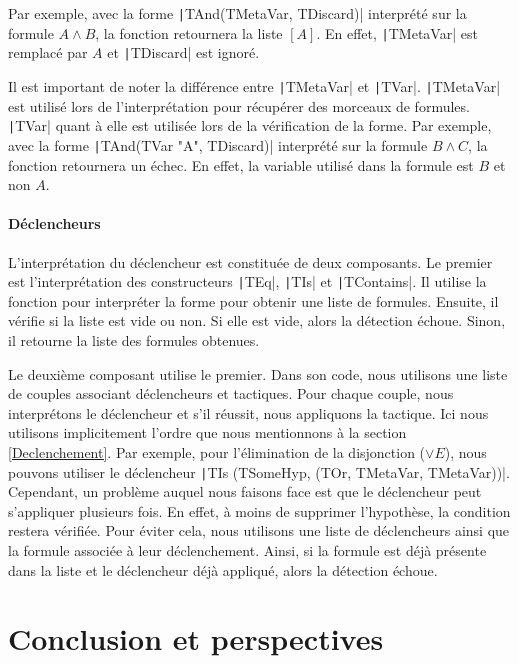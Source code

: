 \documentclass[titlepage]{article}
\begin{document}
Par exemple, avec la forme \texttt|TAnd(TMetaVar, TDiscard)| interprété sur la formule $A \land B$, la fonction retournera la liste $[A]$. En effet, \texttt|TMetaVar| est remplacé par $A$ et \texttt|TDiscard| est ignoré.

Il est important de noter la différence entre \texttt|TMetaVar| et \texttt|TVar|. \texttt|TMetaVar| est utilisé lors de l'interprétation pour récupérer des morceaux de formules. \texttt|TVar| quant à elle est utilisée lors de la vérification de la forme. Par exemple, avec la forme \texttt|TAnd(TVar "A", TDiscard)| interprété sur la formule $B \land C$, la fonction retournera un échec. En effet, la variable utilisé dans la formule est $B$ et non $A$.

\paragraph{Déclencheurs}
L'interprétation du déclencheur est constituée de deux composants. Le premier est l'interprétation des constructeurs \texttt|TEq|, \texttt|TIs| et \texttt|TContains|. Il utilise la fonction pour interpréter la forme pour obtenir une liste de formules. Ensuite, il vérifie si la liste est vide ou non. Si elle est vide, alors la détection échoue. Sinon, il retourne la liste des formules obtenues.

Le deuxième composant utilise le premier. Dans son code, nous utilisons une liste de couples associant déclencheurs et tactiques. Pour chaque couple, nous interprétons le déclencheur et s'il réussit, nous appliquons la tactique. Ici nous utilisons implicitement l'ordre que nous mentionnons à la section \ref{Declenchement}. Par exemple, pour l'élimination de la disjonction ($\lor E$), nous pouvons utiliser le déclencheur \texttt|TIs (TSomeHyp, (TOr, TMetaVar, TMetaVar))|. Cependant, un problème auquel nous faisons face est que le déclencheur peut s'appliquer plusieurs fois. En effet, à moins de supprimer l'hypothèse, la condition restera vérifiée. Pour éviter cela, nous utilisons une liste de déclencheurs ainsi que la formule associée à leur déclenchement. Ainsi, si la formule est déjà présente dans la liste et le déclencheur déjà appliqué, alors la détection échoue.



\section{Conclusion et perspectives}
\end{document}
